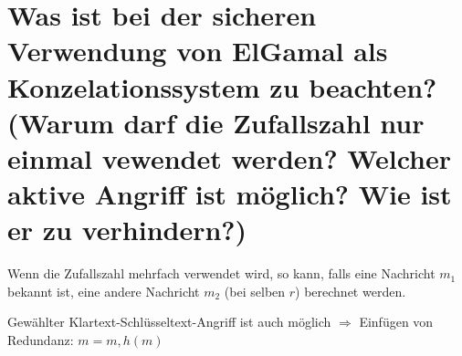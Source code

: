 \documentclass{article}
\begin{document}
	\section*{Was ist bei der sicheren Verwendung von ElGamal als Konzelationssystem zu beachten? (Warum darf die Zufallszahl nur einmal vewendet werden? Welcher aktive Angriff ist möglich? Wie ist er zu verhindern?)}
	Wenn die Zufallszahl mehrfach verwendet wird, so kann, falls eine Nachricht $m_1$ bekannt ist, eine andere Nachricht $m_2$ (bei selben $r$) berechnet werden.
	
	Gewählter Klartext-Schlüsseltext-Angriff ist auch möglich $\Rightarrow$ Einfügen von Redundanz: $m = m, h(m)$
	
\end{document}
